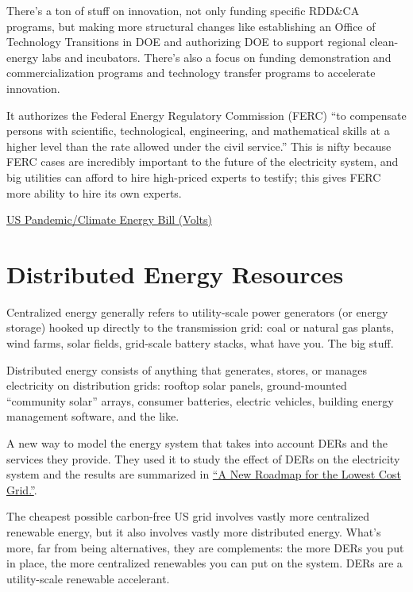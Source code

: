 \documentclass[
]{book}
\begin{document}
There's a ton of stuff on innovation, not only funding specific RDD\&CA programs, but making more structural changes like establishing an Office of Technology Transitions in DOE and authorizing DOE to support regional clean-energy labs and incubators. There's also a focus on funding demonstration and commercialization programs and technology transfer programs to accelerate innovation.

It authorizes the Federal Energy Regulatory Commission (FERC) ``to compensate persons with scientific, technological, engineering, and mathematical skills at a higher level than the rate allowed under the civil service.'' This is nifty because FERC cases are incredibly important to the future of the electricity system, and big utilities can afford to hire high-priced experts to testify; this gives FERC more ability to hire its own experts.

\href{https://www.volts.wtf/p/congress-might-pass-a-huge-energy}{US Pandemic/Climate Energy Bill (Volts)}

\hypertarget{distributed-energy-resources}{%
\chapter{Distributed Energy Resources}\label{distributed-energy-resources}}

Centralized energy generally refers to utility-scale power generators (or energy storage) hooked up directly to the transmission grid: coal or natural gas plants, wind farms, solar fields, grid-scale battery stacks, what have you. The big stuff.

Distributed energy consists of anything that generates, stores, or manages electricity on distribution grids: rooftop solar panels, ground-mounted ``community solar'' arrays, consumer batteries, electric vehicles, building energy management software, and the like.

A new way to model the energy system that takes into account DERs and the services they provide. They used it to study the effect of DERs on the electricity system and the results are summarized in \href{https://www.vibrantcleanenergy.com/wp-content/uploads/2020/12/WhyDERs_ES_Final.pdf}{``A New Roadmap for the Lowest Cost Grid.''}.

The cheapest possible carbon-free US grid involves vastly more centralized renewable energy, but it also involves vastly more distributed energy. What's more, far from being alternatives, they are complements: the more DERs you put in place, the more centralized renewables you can put on the system. DERs are a utility-scale renewable accelerant.
\end{document}
